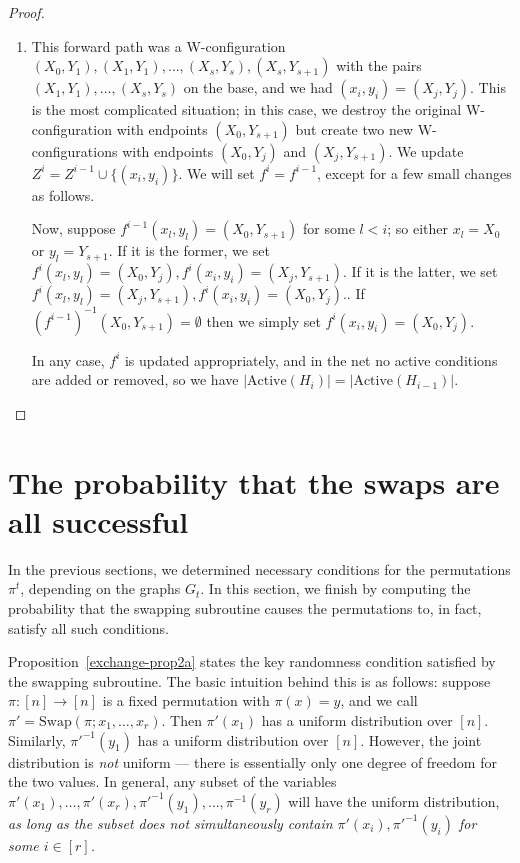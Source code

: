 \begin{proof}
\begin{enumerate}
\item This forward path was a W-configuration $(X_0, Y_1), (X_1, Y_1), \dots, (X_s, Y_s), (X_s, Y_{s+1})$ with the pairs $(X_1, Y_1), \dots, (X_s, Y_s)$ on the base, and we had $(x_i, y_i) = (X_j, Y_j)$. This is the most complicated situation; in this case, we destroy the original W-configuration with endpoints $(X_0, Y_{s+1})$ but create two new W-configurations with endpoints $(X_0, Y_j)$ and $(X_j, Y_{s+1})$. We update $Z^i = Z^{i-1} \cup \{(x_i, y_i) \}$. We will set $f^i = f^{i-1}$, except for a few small changes as follows.

Now, suppose $f^{i-1} (x_l, y_l) = (X_0, Y_{s+1})$ for some $l < i$; so either $x_l = X_0$ or $y_l = Y_{s+1}$. If it is the former, we set $f^i(x_l, y_l) = (X_0, Y_j), f^i(x_i, y_i) = (X_j, Y_{s+1})$. If it is the latter, we set $f^i(x_l, y_l) = (X_j, Y_{s+1}), f^i(x_i, y_i) = (X_0, Y_j).$. If $(f^{i-1})^{-1} (X_0, Y_{s+1}) = \emptyset$ then we simply set $f^i(x_i, y_i) = (X_0, Y_j)$.

In any case, $f^i$ is updated appropriately, and in the net no active conditions are added or removed, so we have $|\text{Active}(H_i)| = |\text{Active}(H_{i-1})|$.
\end{enumerate}
\end{proof}

\section{The probability that the swaps are all successful}
\label{total-prob-sec}
In the previous sections, we determined necessary conditions for the permutations $\pi^t$, depending on the graphs $G_t$. In this section, we finish by computing the probability that the swapping subroutine causes the permutations to, in fact, satisfy all such conditions.

Proposition~\ref{exchange-prop2a} states the key randomness condition satisfied by the swapping subroutine.  The basic intuition behind this is as follows: suppose $\pi: [n] \rightarrow [n]$ is a fixed permutation with $\pi(x) = y$, and we call $\pi' = \text{Swap}(\pi;x_1, \dots, x_r)$. Then $\pi'(x_1)$ has a uniform distribution over $[n]$. Similarly, $\pi'^{-1}(y_1)$ has a uniform distribution over $[n]$. However, the joint distribution is \emph{not} uniform --- there is essentially only one degree of freedom for the two values. In general, any subset of the variables $\pi'(x_1), \dots, \pi'(x_r), \pi'^{-1}(y_1), \dots, \pi^{-1}(y_r)$ will have the uniform distribution, \emph{as long as the subset does not simultaneously contain $\pi'(x_i), \pi'^{-1} (y_i)$ for some $i \in [r]$.}


